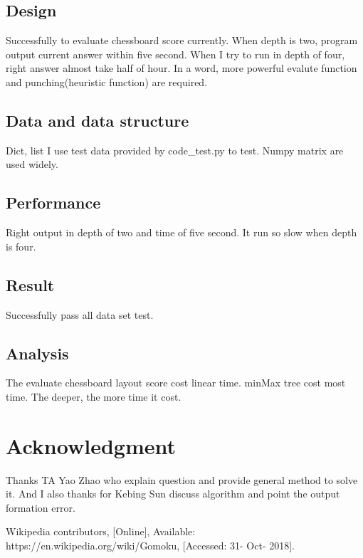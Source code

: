 \documentclass[conference,compsoc]{IEEEtran}
\begin{document}
\subsection{Design}
Successfully to evaluate chessboard score currently. When depth is two, program
output current answer within five second. When I try to run in depth of four,
right answer almost take half of hour. In a word, more powerful evalute
function and punching(heuristic function) are required.

\subsection{Data and data structure}
Dict, list
I use test data provided by code\_test.py to test. Numpy matrix are used widely.

\subsection{Performance}
Right output in depth of two and time of five second. It run so slow when
depth is four.

\subsection{Result}
Successfully pass all data set test.

\subsection{Analysis}
The evaluate chessboard layout score cost linear time. minMax tree cost most
time. The deeper, the more time it cost.

\section*{Acknowledgment}
Thanks TA Yao Zhao who explain question and provide general method to solve it.
And I also thanks for Kebing Sun discuss algorithm and point the output
formation error.


\begin{thebibliography}{1}
Wikipedia contributors, [Online], Available: https://en.wikipedia.org/wiki/Gomoku,
[Accessed: 31- Oct- 2018].
\end{thebibliography}

\end{document}
